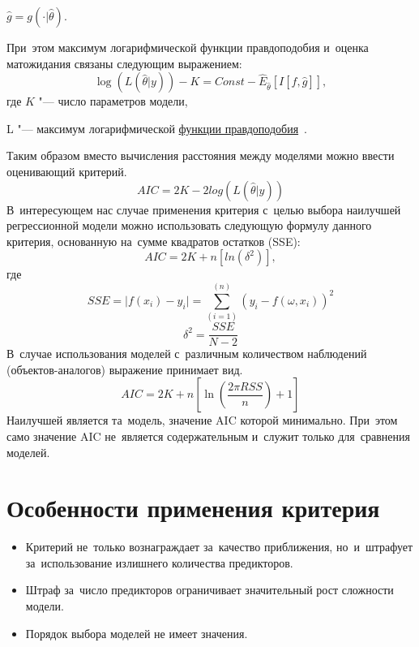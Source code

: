 \documentclass[]{scrartcl}
\begin{document}
$ \hat{g} = g(\cdot|\hat{\theta}) $.

При~этом максимум логарифмической функции правдоподобия и~оценка матожидания связаны следующим выражением:
\begin{equation}\label{AIC-likehood}
\log(L(\hat{\theta}|y)) - K = Const - \hat{E}_{\hat{\theta}}[I[f, \hat{g}]],
\end{equation}
где $ K $ "--- число параметров модели,

L "--- максимум логарифмической \href{https://ru.wikipedia.org/wiki/Функция_правдоподобия}{функции правдоподобия}~\cite{Wiki:likelihood-function, MLRU:likelyhood-function}.

Таким образом вместо вычисления расстояния между моделями можно ввести оценивающий критерий.
\begin{equation}\label{AIC-criterion}
AIC = 2K -2log(L(\hat{\theta}|y))
\end{equation}
В~интересующем нас случае применения критерия с~целью выбора наилучшей регрессионной модели можно использовать следующую формулу данного критерия, основанную на~сумме квадратов остатков (SSE):
\begin{equation}\label{AIC-regression}
AIC = 2K + n[ln(\delta^2)],
\end{equation}
где
\begin{equation}\label{AIC-SSE}
SSE = \lvert f(x_i) - y_i\rvert = \sum_(i=1)^(n)(y_i - f(\omega, x_i))^2
\end{equation}
\begin{equation}\label{AIC-SSE-2}
\delta^2 = \frac{SSE}{N-2}
\end{equation}
В~случае использования моделей с~различным количеством наблюдений (объектов-аналогов) выражение принимает вид.
\begin{equation}\label{AIC-diff-N}
AIC=2K + n[\ln(\frac{2\pi \mathit{RSS}}{n}) + 1]
\end{equation}
Наилучшей является та~модель, значение AIC которой минимально. При~этом само значение AIC не~является содержательным и~служит только для~сравнения моделей.

\section{Особенности применения критерия}
\begin{itemize}
	\item Критерий не~только вознаграждает за~качество приближения, но~и~штрафует за~использование излишнего количества предикторов.
	\item Штраф за~число предикторов ограничивает значительный рост сложности модели. 
	\item Порядок выбора моделей не имеет значения.
\end{itemize}
\end{document}
